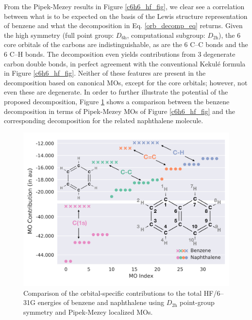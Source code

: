 \documentclass[journal=jctc,manuscript=article]{achemso}
\begin{document}
From the Pipek-Mezey results in Figure \ref{c6h6_hf_fig}, we clear see a correlation between what is to be expected on the basis of the Lewis structure representation of benzene and what the decomposition in Eq. \ref{orb_decomp_eq} returns. Given the high symmetry (full point group: $D_{6\text{h}}$, computational subgroup: $D_{2\text{h}}$), the 6 core orbitals of the carbons are indistinguishable, as are the 6 C--C bonds and the 6 C--H bonds. The decomposition even yields contributions from 3 degenerate carbon double bonds, in perfect agreement with the conventional Kekul{\'e} formula in Figure \ref{c6h6_hf_fig}. Neither of these features are present in the decomposition based on canonical MOs, except for the core orbitals; however, not even these are degenerate. In order to further illustrate the potential of the proposed decomposition, Figure \ref{c10h8_hf_fig} shows a comparison between the benzene decomposition in terms of Pipek-Mezey MOs of Figure \ref{c6h6_hf_fig} and the corresponding decomposition for the related naphthalene molecule.\\
%
\begin{figure}[ht]
\begin{center}
\includegraphics[width=\textwidth]{figures/c10h8_hf_2.pdf}
\caption{Comparison of the orbital-specific contributions to the total HF/6--31G energies of benzene and naphthalene using $D_{2\text{h}}$ point-group symmetry and Pipek-Mezey localized MOs.}
\label{c10h8_hf_fig}
\end{center}
\end{figure}
%
\end{document}
